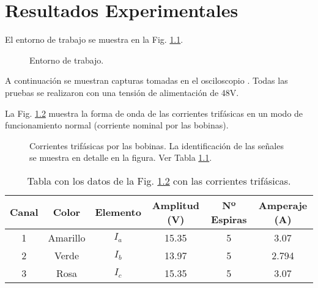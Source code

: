 \documentclass{report}
\begin{document}
\clearpage

\chapter{Resultados Experimentales} \label{sec.osciloscopio}

El entorno de trabajo se muestra en la Fig. \ref{fig.fotolab}.
\begin{figure}[!h]
    \begin{center}
    \caption{Entorno de trabajo.}
    \label{fig.fotolab} 
    \end{center}
\end{figure}



A continuación se muestran capturas tomadas en el osciloscopio \cite{cincuentaydos}. Todas las pruebas se realizaron con una tensión de alimentación de 48V.

La Fig. \ref{fig.20191219_112517_673} muestra la forma de onda de las corrientes trifásicas en un modo de funcionamiento normal (corriente nominal por las bobinas).
\begin{figure}[!h]
    \begin{center}
    \resizebox{10cm}{!}{\texttt{[image: 20191219\_112517\_673]}}
    \caption{Corrientes trifásicas por las bobinas.  La identificación de las señales se muestra en detalle en la figura. Ver Tabla \ref{tab.20191219_112517_673}.}
    \label{fig.20191219_112517_673} 
    \end{center}
\end{figure}

\begin{table}[!h]
    \begin{center}
    \begin{tabular}{|c|c|c|c|c|c|} \hline\hline\hline
        \textbf{Canal} & \textbf{Color} & \textbf{Elemento} & \textbf{Amplitud (V)} & \textbf{Nº Espiras} & \textbf{Amperaje (A)} \\ \hline
    1 & Amarillo & $I_{a}$ & 15.35 & 5 & 3.07\\ \hline
    2 & Verde  & $I_{b}$ & 13.97 & 5 & 2.794\\ \hline   
    3 & Rosa  & $I_{c}$ & 15.35 & 5 & 3.07 \\ \hline
    \end{tabular}
    \end{center}
    \caption{Tabla con los datos de la Fig. \ref{fig.20191219_112517_673} con las corrientes trifásicas.} \label{tab.20191219_112517_673}
\end{table}
\end{document}

